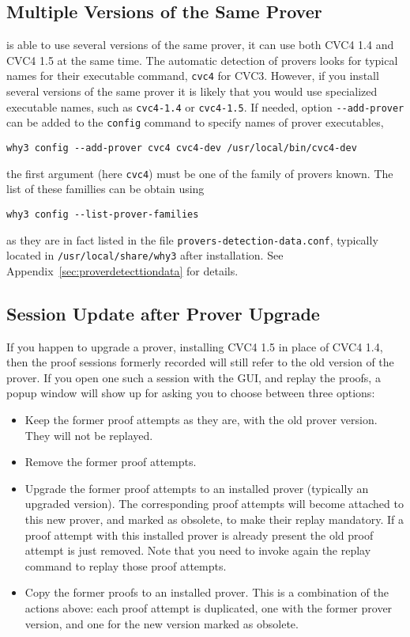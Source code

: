 \subsection{Multiple Versions of the Same Prover}

\why is able to use several versions of the same
prover, \eg it can use both CVC4 1.4 and CVC4 1.5 at the same time.
The automatic detection of provers looks for typical names for their
executable command, \eg \texttt{cvc4} for CVC3. However, if you
install several versions of the same prover it is likely that you would
use specialized executable names, such as \texttt{cvc4-1.4} or
\texttt{cvc4-1.5}. If needed, option \verb|--add-prover| can be
added to the \texttt{config} command to specify names of prover executables, \eg
{}
\begin{verbatim}
why3 config --add-prover cvc4 cvc4-dev /usr/local/bin/cvc4-dev
\end{verbatim}
the first argument (here \verb|cvc4|) must be one of the family of
provers known. The list of these famillies can be obtain using
\begin{verbatim}
why3 config --list-prover-families
\end{verbatim}
as they are in fact listed in the file \verb|provers-detection-data.conf|, typically
located in \verb|/usr/local/share/why3| after installation. See
Appendix~\ref{sec:proverdetecttiondata} for details.


\subsection{Session Update after Prover Upgrade}
\label{sec:uninstalledprovers}

If you happen to upgrade a prover, \eg installing CVC4 1.5 in place
of CVC4 1.4, then the proof sessions formerly recorded will still
refer to the old version of the prover. If you open one such a session
with the GUI, and replay the proofs, a popup window will show up for asking you to choose
between three options:
\begin{itemize}
\item Keep the former proof attempts as they are, with the old prover version. They will not be replayed.
\item Remove the former proof attempts.
\item Upgrade the former proof attempts to an installed prover
  (typically an upgraded version). The corresponding proof attempts
  will become attached to this new prover, and marked as obsolete, to
  make their replay mandatory. If a proof attempt with this installed prover
  is already present the old proof attempt is just removed. Note that you
  need to invoke again the replay command to replay those proof
  attempts.
\item Copy the former proofs to an installed prover. This is a
  combination of the actions above: each proof attempt is duplicated,
  one with the former prover version, and one for the new
  version marked as obsolete.
\end{itemize}

